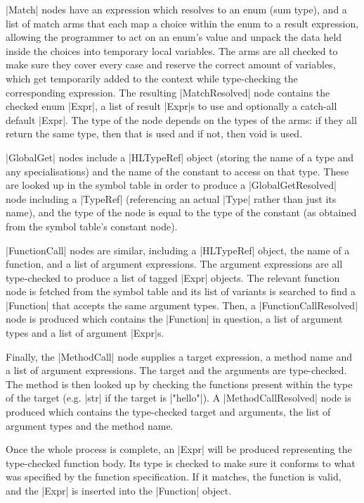 \documentclass[11pt]{report}
\begin{document}
|Match| nodes have an expression which resolves to an enum (sum type), and a list of match arms that each map a choice within the enum to a result expression, allowing the programmer to act on an enum's value and unpack the data held inside the choices into temporary local variables. The arms are all checked to make sure they cover every case and reserve the correct amount of variables, which get temporarily added to the context while type-checking the corresponding expression. The resulting |MatchResolved| node contains the checked enum |Expr|, a list of result |Expr|s to use and optionally a catch-all default |Expr|. The type of the node depends on the types of the arms: if they all return the same type, then that is used and if not, then void is used.

|GlobalGet| nodes include a |HLTypeRef| object (storing the name of a type and any specialisations) and the name of the constant to access on that type. These are looked up in the symbol table in order to produce a |GlobalGetResolved| node including a |TypeRef| (referencing an actual |Type| rather than just its name), and the type of the node is equal to the type of the constant (as obtained from the symbol table's constant node).

|FunctionCall| nodes are similar, including a |HLTypeRef| object, the name of a function, and a list of argument expressions. The argument expressions are all type-checked to produce a list of tagged |Expr| objects. The relevant function node is fetched from the symbol table and its list of variants is searched to find a |Function| that accepts the same argument types. Then, a |FunctionCallResolved| node is produced which contains the |Function| in question, a list of argument types and a list of argument |Expr|s.

Finally, the |MethodCall| node supplies a target expression, a method name and a list of argument expressions. The target and the arguments are type-checked. The method is then looked up by checking the functions present within the type of the target (e.g. |str| if the target is |"hello"|). A |MethodCallResolved| node is produced which contains the type-checked target and arguments, the list of argument types and the method name.

Once the whole process is complete, an |Expr| will be produced representing the type-checked function body. Its type is checked to make sure it conforms to what was specified by the function specification. If it matches, the function is valid, and the |Expr| is inserted into the |Function| object.
\end{document}
